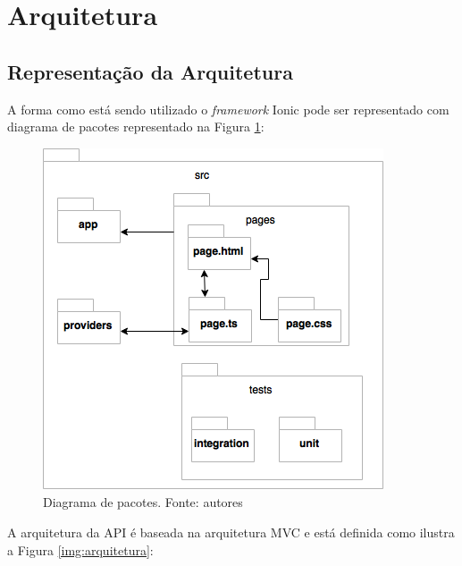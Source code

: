 \section{Arquitetura}

\subsection{Representação da Arquitetura}

A forma como está sendo utilizado o \textit{framework} Ionic pode ser representado com diagrama de pacotes representado na Figura \ref{img:pacotes}:

\begin{figure}[H]
    \centering
    \includegraphics[scale=0.5]{figuras/ionic_arch.png}
    \caption[Diagrama de pacotes do aplicativo]{Diagrama de pacotes. Fonte: autores}
    \label{img:pacotes}
\end{figure}

A arquitetura da API é baseada na arquitetura MVC e está definida como ilustra a Figura \ref{img:arquitetura}:

